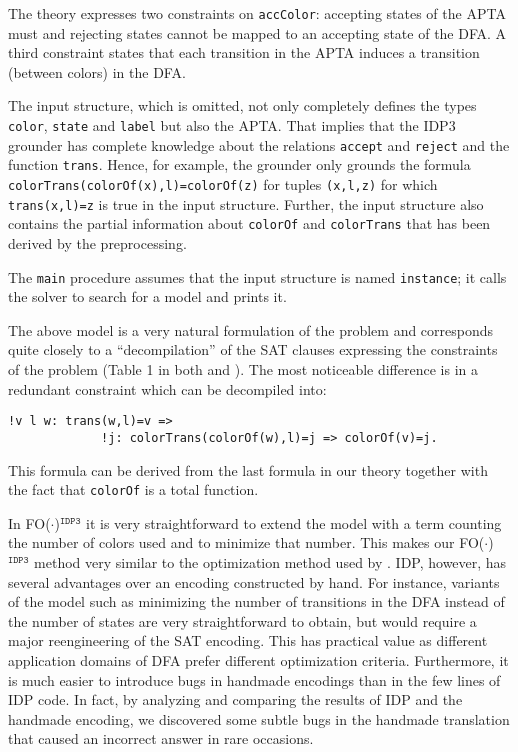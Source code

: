 \documentclass{tlp}
\newcommand{\idp}{{\sc IDP}\xspace}
\newcommand{\idpdrie}{{\sc IDP3}\xspace}
\newcommand{\fodotidp}{{\sc FO($\cdot$)$^{\mathtt{IDP3}}$}\xspace}
\renewcommand{\|}{\ensuremath{\,|\,}}
\renewcommand{\|}{\,|\,}
\newcommand{\idpcode}[1]{\lstinline{#1}}
\begin{document}
The theory expresses two constraints on \texttt{accColor}: accepting
states of the APTA must and rejecting states cannot be mapped to an
accepting state of the DFA. A third constraint states that each
transition in the APTA induces a transition (between colors) in the
DFA. 

The input structure, which is omitted, not only completely defines the
types \texttt{color}, \texttt{state} and \texttt{label} but also the
APTA. That implies that the \idpdrie grounder has complete
knowledge about the relations \texttt{accept} and \texttt{reject} and
the function \texttt{trans}.  Hence, for example, the grounder only
grounds the formula\\ \idpcode{colorTrans(colorOf(x),l)=colorOf(z)} for
tuples \texttt{(x,l,z)} for which \idpcode{trans(x,l)=z} is true
in the input structure. Further, the input structure also contains the
partial information about \texttt{colorOf} and \texttt{colorTrans}
that has been derived by the preprocessing.

The \texttt{main} procedure assumes that the input structure is named
\texttt{instance}; it calls the solver to search for a model and
prints it.

The above model is a very natural formulation of the problem and 
corresponds quite closely to a ``decompilation'' of the SAT
clauses expressing the constraints of the problem (Table 1 in both
 and ).  The most noticeable difference is in a
redundant constraint which can be decompiled into:
\begin{lstlisting}[caption={Redundant constraint},label={fig:redundant-dfa}]
!v l w: trans(w,l)=v => 
             !j: colorTrans(colorOf(w),l)=j => colorOf(v)=j.
\end{lstlisting} 
This formula can be derived from the last formula in our theory
together with the fact that \texttt{colorOf} is a total function.

In \fodotidp it is very straightforward to extend the model with a term
counting the number of colors used and to minimize that number. This
makes our \fodotidp method very similar to the optimization method used
by . \idp, however, has several advantages over
an encoding constructed by hand. For instance, variants of the model
such as minimizing the number of
transitions in the DFA instead of the number of states are very
straightforward to obtain, but would require a major reengineering of
the SAT encoding.  This has practical value as different application
domains of DFA prefer different optimization criteria. Furthermore, it
is much easier to introduce bugs in handmade encodings than in the few
lines of \idp code. In fact, by analyzing and comparing the results of \idp
and the handmade encoding, we discovered some subtle bugs in 
the handmade translation that caused an incorrect answer in rare occasions.
\end{document}
